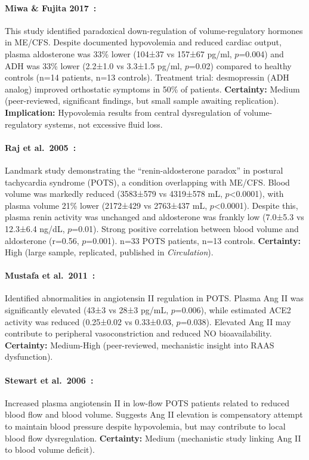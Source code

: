 \paragraph{Miwa \& Fujita 2017~\cite{Miwa2017}:}
This study identified paradoxical down-regulation of volume-regulatory hormones in ME/CFS. Despite documented hypovolemia and reduced cardiac output, plasma aldosterone was 33\% lower (104±37 vs 157±67 pg/ml, $p$=0.004) and ADH was 33\% lower (2.2±1.0 vs 3.3±1.5 pg/ml, $p$=0.02) compared to healthy controls (n=14 patients, n=13 controls). Treatment trial: desmopressin (ADH analog) improved orthostatic symptoms in 50\% of patients. \textbf{Certainty:} Medium (peer-reviewed, significant findings, but small sample awaiting replication). \textbf{Implication:} Hypovolemia results from central dysregulation of volume-regulatory systems, not excessive fluid loss.

\paragraph{Raj et al.\ 2005~\cite{Raj2005}:}
Landmark study demonstrating the ``renin-aldosterone paradox'' in postural tachycardia syndrome (POTS), a condition overlapping with ME/CFS. Blood volume was markedly reduced (3583±579 vs 4319±578 mL, $p$<0.0001), with plasma volume 21\% lower (2172±429 vs 2763±437 mL, $p$<0.0001). Despite this, plasma renin activity was unchanged and aldosterone was frankly low (7.0±5.3 vs 12.3±6.4 ng/dL, $p$=0.01). Strong positive correlation between blood volume and aldosterone (r=0.56, $p$=0.001). n=33 POTS patients, n=13 controls. \textbf{Certainty:} High (large sample, replicated, published in \textit{Circulation}).

\paragraph{Mustafa et al.\ 2011~\cite{Mustafa2011}:}
Identified abnormalities in angiotensin II regulation in POTS. Plasma Ang II was significantly elevated (43±3 vs 28±3 pg/mL, $p$=0.006), while estimated ACE2 activity was reduced (0.25±0.02 vs 0.33±0.03, $p$=0.038). Elevated Ang II may contribute to peripheral vasoconstriction and reduced NO bioavailability. \textbf{Certainty:} Medium-High (peer-reviewed, mechanistic insight into RAAS dysfunction).

\paragraph{Stewart et al.\ 2006~\cite{Stewart2006}:}
Increased plasma angiotensin II in low-flow POTS patients related to reduced blood flow and blood volume. Suggests Ang II elevation is compensatory attempt to maintain blood pressure despite hypovolemia, but may contribute to local blood flow dysregulation. \textbf{Certainty:} Medium (mechanistic study linking Ang II to blood volume deficit).

